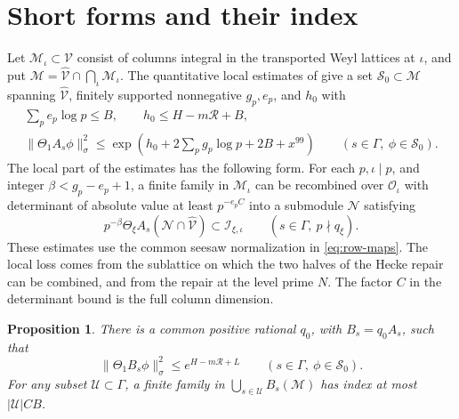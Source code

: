 \documentclass[11pt,reqno]{amsart}
\newtheorem{proposition}[theorem]{Proposition}
\theoremstyle{definition}
\numberwithin{equation}{section}
\newcommand{\of}{\mathcal O}
\begin{document}
\section{Short forms and their index}\label{sec:short}

Let \(\mathcal M_\iota\subset\mathcal V\) consist of columns
integral in the transported Weyl lattices at \(\iota\), and put
\(\mathcal M=\widehat{\mathcal V}\cap\bigcap_\iota\mathcal M_\iota\).
The quantitative local estimates of
\cite[Proposition~9.14, {\rm(5.1)--(5.3)}]{chojecki} give
a set \(\mathcal S_0\subset\mathcal M\) spanning
\(\widehat{\mathcal V}\), finitely supported nonnegative
\(g_p,e_p\), and \(h_0\) with
\begin{equation}\label{eq:short-estimates}
 \begin{gathered}
 \sum_p e_p\log p\le B,\qquad h_0\le H-m\mathcal R+B,\\
 \|\Theta_1 A_s\phi\|_\sigma^2
   \le \exp\left(h_0+2\sum_p g_p\log p+2B+x^{99}\right)
       \qquad (s\in\Gamma,\ \phi\in\mathcal S_0).
 \end{gathered}
\end{equation}
The local part of the estimates has the following form. For
each \(p,\iota\mid p\), and integer \(\beta<g_p-e_p+1\),
a finite family in \(\mathcal M_\iota\) can be recombined
over \(\of_\iota\) with determinant of absolute value at least
\(p^{-e_p C}\) into a submodule \(\mathcal N\) satisfying
\begin{equation}\label{eq:short-gain}
  p^{-\beta}\Theta_\xi A_s(\mathcal N\cap\widehat{\mathcal V})
       \subset\mathcal I_{\xi,\iota}
       \qquad (s\in\Gamma,\ p\nmid q_\xi).
\end{equation}
These estimates use the common seesaw normalization in
\eqref{eq:row-maps}. The local loss comes from the sublattice
on which the two halves of the Hecke repair can be combined,
and from the repair at the level prime \(N\). The factor \(C\)
in the determinant bound is the full column dimension.

\begin{proposition}\label{prop:short}
There is a common positive rational \(q_0\), with
\(B_s=q_0A_s\), such that
\[
 \|\Theta_1 B_s\phi\|_\sigma^2\le e^{H-m\mathcal R+L}
 \qquad(s\in\Gamma,\ \phi\in\mathcal S_0).
\]
For any subset \(\mathcal U\subset\Gamma\), a finite family
in \(\bigcup_{s\in\mathcal U} B_s(\mathcal M)\) has index at
most \(|\mathcal U|CB\).
\end{proposition}
\end{document}
